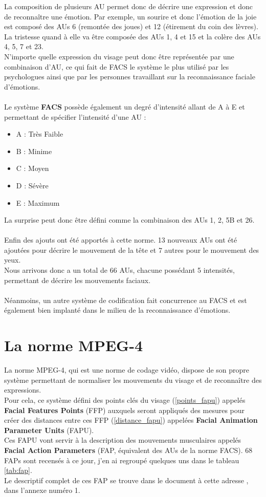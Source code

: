 \documentclass[poster]{polytech/polytech}
\begin{document}
La composition de plusieurs AU permet donc de décrire une expression et donc de reconnaître une émotion. Par exemple, un sourire et donc l'émotion de la joie est composé des AUs 6 (remontée des joues) et 12 (étirement du coin des lèvres).\\
La tristesse quand à elle va être composée des AUs 1, 4 et 15 et la colère des AUs 4, 5, 7 et 23.\\
N'importe quelle expression du visage peut donc être représentée par une combinaison d'AU, ce qui fait de FACS le système le plus utilisé par les psychologues ainsi que par les personnes travaillant sur la reconnaissance faciale d'émotions.\\
\\
Le système \textbf{FACS} possède également un degré d'intensité allant de A à E et permettant de spécifier l'intensité d'une AU :
\begin{itemize}
	\item A : Très Faible
	\item B : Minime
	\item C : Moyen
	\item D : Sévère
	\item E : Maximum
\end{itemize}
La surprise peut donc être défini comme la combinaison des AUs 1, 2, 5B et 26.\\
\\
Enfin des ajouts ont été apportés à cette norme. 13 nouveaux AUs ont été ajoutées pour décrire le mouvement de la tête et 7 autres pour le mouvement des yeux.\\
Nous arrivons donc a un total de 66 AUs, chacune possédant 5 intensités, permettant de décrire les mouvements faciaux.\\
\\
Néanmoins, un autre système de codification fait concurrence au FACS et est également bien implanté dans le milieu de la reconnaissance d'émotions.

\section{La norme MPEG-4}
\label{sec:fapu}

La norme MPEG-4, qui est une norme de codage vidéo, dispose de son propre système permettant de normaliser les mouvements du visage et de reconnaître des expressions.\\
Pour cela, ce système défini des points clés du visage (\autoref{points_fapu}) appelés \textbf{Facial Features Points} (FFP) auxquels seront appliqués des mesures pour créer des distances entre ces FFP (\autoref{distance_fapu}) appelées \textbf{Facial Animation Parameter Units} (FAPU).\\
Ces FAPU vont servir à la description des mouvements musculaires appelés \textbf{Facial Action Parameters} (FAP, équivalent des AUs de la norme FACS). 68 FAPs sont recensés à ce jour, j'en ai regroupé quelques uns dans le tableau \autoref{tab:fap}.\\
Le descriptif complet de ces FAP se trouve dans le document à cette adresse \cite{urlfaps}, dans l'annexe numéro 1.
\end{document}
